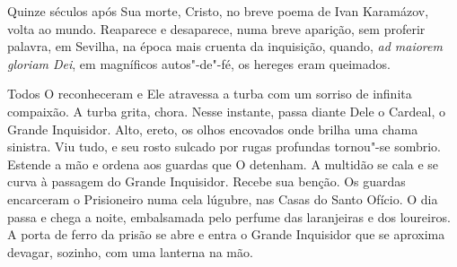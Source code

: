 Quinze séculos após Sua morte, Cristo, no breve poema de Ivan Karamázov,
volta ao mundo. Reaparece e desaparece, numa breve aparição, sem
proferir palavra, em Sevilha, na época mais cruenta da inquisição,
quando, \emph{ad maiorem gloriam Dei}, em magníficos autos"-de"-fé, os
hereges eram queimados.

Todos O reconheceram e Ele atravessa a turba com um sorriso de infinita
compaixão. A turba grita, chora. Nesse instante, passa diante Dele o
Cardeal, o Grande Inquisidor. Alto, ereto, os olhos encovados onde
brilha uma chama sinistra. Viu tudo, e seu rosto sulcado por rugas
profundas tornou"-se sombrio. Estende a mão e ordena aos guardas que O
detenham. A multidão se cala e se curva à passagem do Grande Inquisidor.
Recebe sua benção. Os guardas encarceram o Prisioneiro numa cela
lúgubre, nas Casas do Santo Ofício. O dia passa e chega a noite,
embalsamada pelo perfume das laranjeiras e dos loureiros. A porta de
ferro da prisão se abre e entra o Grande Inquisidor que se aproxima
devagar, sozinho, com uma lanterna na mão.

